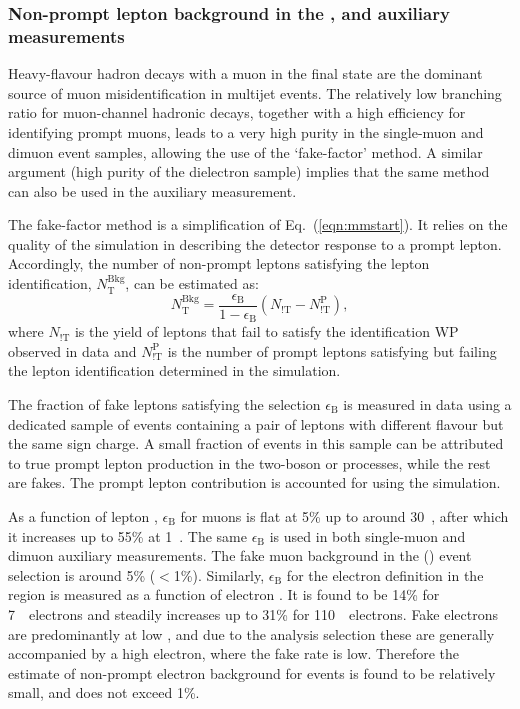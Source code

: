 \documentclass[atlasdraft=false, cernpreprint, UKenglish, texmf, orcidlogo]{atlasdoc}
\begin{document}
 
\subsubsection{Non-prompt lepton background in the \onemujets{}, \twomujets{} and  \twoeljets{}  auxiliary measurements  \label{sec:fakemu}}
 
Heavy-flavour hadron decays with a muon in the final state are the dominant source of muon misidentification in multijet events.
The relatively low branching ratio for muon-channel hadronic decays, together with a high efficiency for identifying prompt muons,
leads to a very high purity in the  single-muon and dimuon event samples, allowing the use of the `fake-factor' method.
A similar argument (high purity of the dielectron sample) implies that the same method can also be used in the \twoeljets{} auxiliary measurement.
 
The fake-factor method is a simplification of Eq.~(\ref{eqn:mmstart}).  It relies on the quality of the simulation in describing the detector response to a prompt lepton.
Accordingly,  the number of non-prompt leptons satisfying the   lepton identification, \(N_\textrm{T}^\textrm{Bkg}\),  can be estimated as:
\begin{equation} \label{eqn:fffinal}
N_\textrm{T}^\textrm{Bkg} = \frac{\epsilon_\textrm{B}}{1 -\epsilon_\textrm{B}}
\left(   N_\textrm{!T}  - N_\textrm{!T}^\textrm{P} \right),
\end{equation}
where \(N_\textrm{!T}  \) is the yield of  leptons that fail to satisfy the  identification WP observed in data and  \(N_\textrm{!T}^\textrm{P} \)
is the number of prompt leptons satisfying  but failing the   lepton identification determined in the simulation.
 
The fraction of fake leptons satisfying the selection \(\epsilon_\textrm{B}\) is measured in data using a
dedicated sample of events containing a pair of leptons with different flavour but the same sign charge.
A small fraction of events in this sample can be attributed to true prompt lepton production in the two-boson or \ttbar{} processes,
while the rest are fakes.
The prompt lepton contribution is accounted for using the simulation.
 
As a function of lepton \pt{}, \(\epsilon_\textrm{B}\) for muons is flat at 5\% up to around 30~\GeV, after which it increases up to 55\% at 1~\TeV.
The  same \(\epsilon_\textrm{B}\)  is used in both single-muon and dimuon  auxiliary measurements.
The fake muon background in the \onemujets(\twomujets) event selection is around 5\% ($<$1\%).
Similarly, \(\epsilon_\textrm{B}\) for the electron definition in the \twoeljets{} region is measured as a function of electron \pt{}.
It is found to be 14\% for 7~\GeV\ electrons and steadily increases up to 31\% for 110~\GeV\ electrons.
Fake electrons are predominantly at low \pt{}, and due to the analysis selection these are generally
accompanied by a high \pt{} electron, where the fake rate is low.
Therefore the estimate of non-prompt electron background for \twoeljets{} events is found to be relatively small, and does not exceed 1\%.
 
\end{document}
